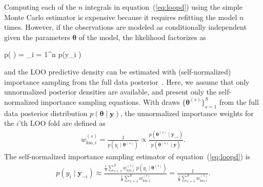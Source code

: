 \documentclass[12pt]{article}
\newenvironment{nalign}{
    \begin{equation}
    \begin{aligned}
}{
    \end{aligned}
    \end{equation}
    \ignorespacesafterend
}
\newenvironment{nalign*}{
    \begin{equation*}
    \begin{aligned}
}{
    \end{aligned}
    \end{equation*}
    \ignorespacesafterend
}
\begin{document}
\begin{appendices}
%
Computing each of the $n$ integrals in equation~(\ref{eq:loopd})
using the simple Monte Carlo estimator is expensive because it
requires refitting the model $n$ times.
However,
if the observations are modeled as conditionally independent given the parameters $\boldsymbol{\theta}$ of the model, the likelihood factorizes as
\begin{nalign*}
	p( \mid \boldsymbol{\theta}) = \prod_{i = 1}^n p(y_i \mid \boldsymbol{\theta}) 
\end{nalign*}
and the LOO predictive density can be estimated with (self-normalized) importance sampling from the full data posterior~\citep{gelfand1992model}.
Here, we assume that only unnormalized posterior densities are available, and
present only the self-normalized importance sampling equations.
With draws $\{ \boldsymbol{\theta}^{(s)} \}_{s=1}^{S} $ from the full data posterior distribution $p (\boldsymbol{\theta} \mid \mathbf{y})$,
the unnormalized importance weights for the $i$'th LOO fold are defined as
\begin{nalign} \label{eq:rawisw}
w_{\text{loo},i}^{(s)} = \frac{1}{p (y_i \mid \boldsymbol{\theta}^{(s)})} \propto \frac{p (\boldsymbol{\theta}^{(s)} \mid \mathbf{y}_{-i} )}{p (\boldsymbol{\theta}^{(s)} \mid \mathbf{y} )} .
\end{nalign}
The self-normalized importance sampling estimator of equation~(\ref{eq:loopd}) is
%
%
%
\begin{nalign} \label{eq:isloosimp}
p (y_i \mid \mathbf{y}_{-i}) \approx  \frac{ \frac{1}{S} \sum_{s = 1}^{S} w_{\text{loo},i}^{(s)} \;  p (y_i \mid \boldsymbol{\theta}^{(s)})   }{ \frac{1}{S} \sum_{s = 1}^{S} w_{\text{loo},i}^{(s)}} =  \frac{1}{ \frac{1}{S} \sum_{s = 1}^{S} w_{\text{loo},i}^{(s)}}.
\end{nalign}












\end{appendices}
\end{document}
